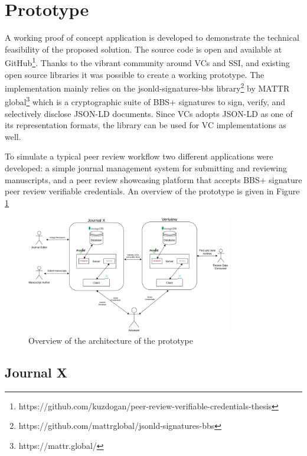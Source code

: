 \section{Prototype}


A working proof of concept application is developed to demonstrate the technical feasibility of the proposed solution. The source code is open and available at GitHub\footnote{https://github.com/kuzdogan/peer-review-verifiable-credentials-thesis}. Thanks to the vibrant community around VCs and SSI, and existing open source libraries it was possible to create a working prototype. The implementation mainly relies on the jsonld-signatures-bbs library\footnote{https://github.com/mattrglobal/jsonld-signatures-bbs} by MATTR global\footnote{https://mattr.global/} which is a cryptographic suite of BBS+ signatures to sign, verify, and selectively disclose JSON-LD documents. Since VCs adopts JSON-LD as one of its representation formats, the library can be used for VC implementations as well.

To simulate a typical peer review workflow two different applications were developed: a simple journal management system for submitting and reviewing manuscripts, and a peer review showcasing platform that accepts BBS+ signature peer review verifiable credentials. An overview of the prototype is given in Figure \ref{fig:prototype}

\begin{figure}[htpb]
  \centering
  \includegraphics[width=0.8\textwidth]{figures/prototype.png}
  \caption{Overview of the architecture of the prototype} \label{fig:prototype}
\end{figure}

\subsection{Journal X}

